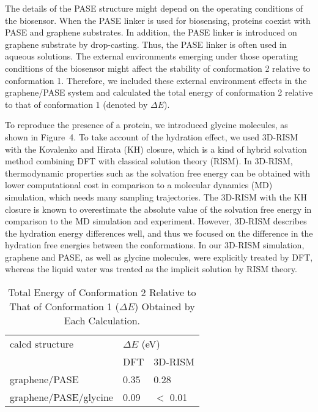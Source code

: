 \documentclass[journal=acsodf,manuscript=article]{achemso}
\begin{document}
The details of the PASE structure might depend on the operating conditions of the biosensor. When the PASE linker is used for biosensing, proteins coexist with PASE and graphene substrates. In addition, the PASE linker is introduced on graphene substrate by drop-casting. Thus, the PASE linker is often used in aqueous solutions. The external environments emerging under those operating conditions of the biosensor might affect the stability of conformation 2 relative to conformation 1. Therefore, we included these external environment effects in the graphene/PASE system and calculated the total energy of conformation 2 relative to that of conformation 1 (denoted by $\Delta E$).

To reproduce the presence of a protein, we introduced glycine molecules, as shown in Figure\ 4. To take account of the hydration effect, we used 3D-RISM with the Kovalenko and Hirata (KH) closure\cite{kovalenko1999self}, which is a kind of hybrid solvation method combining DFT with classical solution theory (RISM)\cite{hirata1981extended,hirata1982application}. In 3D-RISM, thermodynamic properties such as the solvation free energy can be obtained with lower computational cost in comparison to a molecular dynamics (MD) simulation, which needs many sampling trajectories. The 3D-RISM with the KH closure is known to overestimate the absolute value of the solvation free energy in comparison to the MD simulation and experiment\cite{truchon2014cavity}. However, 3D-RISM describes the hydration energy differences well, and thus we focused on the difference in the hydration free energies between the conformations. In our 3D-RISM simulation, graphene and PASE, as well as glycine molecules, were explicitly treated by DFT, whereas the liquid water was treated as the implicit solution by RISM theory. 

\begin{table}[t]
\caption{Total Energy of Conformation 2 Relative to That of Conformation 1 ($\Delta E$) Obtained by Each Calculation.}
\begin{tabular}{|l|l|l|} \hline
calcd structure & \multicolumn{2}{|l|}{$\Delta E$ (eV)}  \\ \cline{2-3}
                                  & DFT & 3D-RISM  \\ \hline \hline
graphene/PASE  & 0.35 & 0.28 \\ \hline
graphene/PASE/glycine  & 0.09 & $<$ 0.01   \\  \hline                                    
\end{tabular}
\end{table} 
\end{document}
